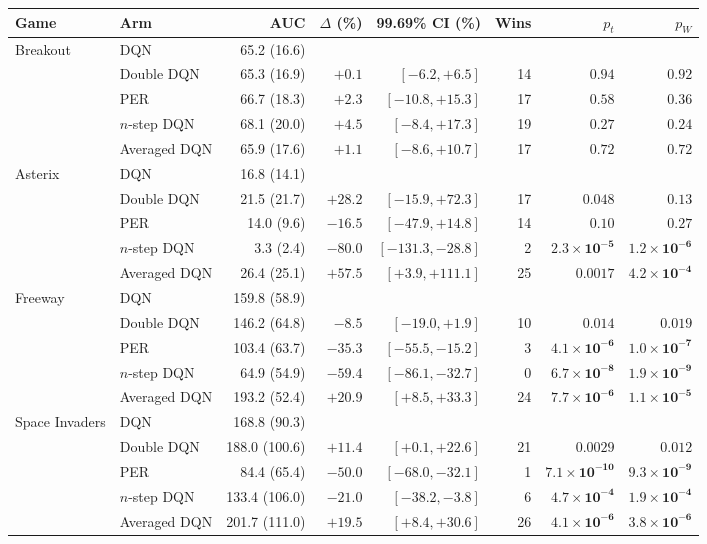 \begin{tabular}{llrrrrrr}
\toprule
Game & Arm & AUC & $\Delta$ (\%) & 99.69\% CI (\%) & Wins & $p_t$ & $p_W$ \\
\midrule
Breakout & DQN & 65.2 (16.6) & & & & & \\
 & Double DQN & 65.3 (16.9) & $+0.1$ & $[-6.2, +6.5]$ & 14 & $0.94$ & $0.92$ \\
 & PER & 66.7 (18.3) & $+2.3$ & $[-10.8, +15.3]$ & 17 & $0.58$ & $0.36$ \\
 & $n$-step DQN & 68.1 (20.0) & $+4.5$ & $[-8.4, +17.3]$ & 19 & $0.27$ & $0.24$ \\
 & Averaged DQN & 65.9 (17.6) & $+1.1$ & $[-8.6, +10.7]$ & 17 & $0.72$ & $0.72$ \\
\midrule
Asterix & DQN & 16.8 (14.1) & & & & & \\
 & Double DQN & 21.5 (21.7) & $+28.2$ & $[-15.9, +72.3]$ & 17 & $0.048$ & $0.13$ \\
 & PER & 14.0 (9.6) & $-16.5$ & $[-47.9, +14.8]$ & 14 & $0.10$ & $0.27$ \\
 & $n$-step DQN & 3.3 (2.4) & $-80.0$ & $[-131.3, -28.8]$ & 2 & $\mathbf{2.3\times10^{-5}}$ & $\mathbf{1.2\times10^{-6}}$ \\
 & Averaged DQN & 26.4 (25.1) & $+57.5$ & $[+3.9, +111.1]$ & 25 & $\mathbf{0.0017}$ & $\mathbf{4.2\times10^{-4}}$ \\
\midrule
Freeway & DQN & 159.8 (58.9) & & & & & \\
 & Double DQN & 146.2 (64.8) & $-8.5$ & $[-19.0, +1.9]$ & 10 & $0.014$ & $0.019$ \\
 & PER & 103.4 (63.7) & $-35.3$ & $[-55.5, -15.2]$ & 3 & $\mathbf{4.1\times10^{-6}}$ & $\mathbf{1.0\times10^{-7}}$ \\
 & $n$-step DQN & 64.9 (54.9) & $-59.4$ & $[-86.1, -32.7]$ & 0 & $\mathbf{6.7\times10^{-8}}$ & $\mathbf{1.9\times10^{-9}}$ \\
 & Averaged DQN & 193.2 (52.4) & $+20.9$ & $[+8.5, +33.3]$ & 24 & $\mathbf{7.7\times10^{-6}}$ & $\mathbf{1.1\times10^{-5}}$ \\
\midrule
Space Invaders & DQN & 168.8 (90.3) & & & & & \\
 & Double DQN & 188.0 (100.6) & $+11.4$ & $[+0.1, +22.6]$ & 21 & $\mathbf{0.0029}$ & $0.012$ \\
 & PER & 84.4 (65.4) & $-50.0$ & $[-68.0, -32.1]$ & 1 & $\mathbf{7.1\times10^{-10}}$ & $\mathbf{9.3\times10^{-9}}$ \\
 & $n$-step DQN & 133.4 (106.0) & $-21.0$ & $[-38.2, -3.8]$ & 6 & $\mathbf{4.7\times10^{-4}}$ & $\mathbf{1.9\times10^{-4}}$ \\
 & Averaged DQN & 201.7 (111.0) & $+19.5$ & $[+8.4, +30.6]$ & 26 & $\mathbf{4.1\times10^{-6}}$ & $\mathbf{3.8\times10^{-6}}$ \\
\bottomrule
\end{tabular}
